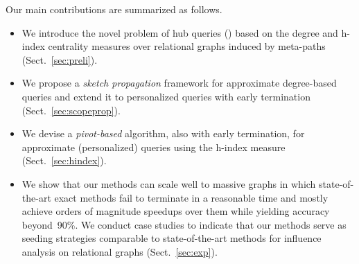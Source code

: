 Our main contributions are summarized as follows.
\begin{itemize}[leftmargin=*]
  \item We introduce the novel problem of hub queries (\ced) based on the degree and h-index centrality measures over relational graphs induced by meta-paths (Sect.~\ref{sec:preli}).
  \item We propose a \emph{sketch propagation} framework for approximate degree-based \ced queries and extend it to personalized \ced queries with early termination (Sect.~\ref{sec:scopeprop}).
  \item We devise a \emph{pivot-based} algorithm, also with early termination, for approximate (personalized) \ced queries using the h-index measure (Sect.~\ref{sec:hindex}).
  \item We show that our methods can scale well to massive graphs in which state-of-the-art exact methods fail to terminate in a reasonable time and mostly achieve orders of magnitude speedups over them while yielding accuracy beyond~90\%. We conduct case studies to indicate that our methods serve as seeding strategies comparable to state-of-the-art methods for influence analysis on relational graphs (Sect.~\ref{sec:exp}).
\end{itemize}
